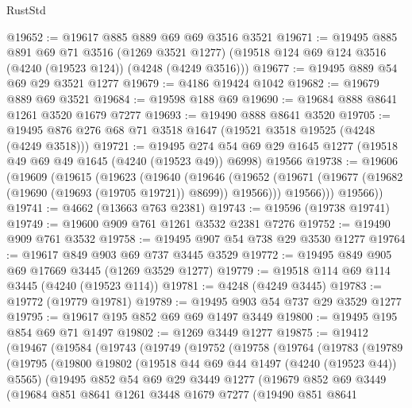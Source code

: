 \begin{lexlean}{RustStd}
\begin{coremodule}
{\begin{coremodule}
{{{{{{{{{{{{{{{{{{{{{{{{{{{{{{{{{{{@19652 := @19617 @885 @889 @69 @69 @3516 @3521
@19671 := @19495
    @885
    @891
    @69
    @71
    @3516
    (@1269 @3521 @1277)
    (@19518 @124 @69 @124 @3516 (@4240 (@19523 @124)) (@4248 (@4249 @3516)))
@19677 := @19495 @889 @54 @69 @29 @3521 @1277
@19679 := @4186 @19424 @1042
@19682 := @19679 @889 @69 @3521
@19684 := @19598 @188 @69
@19690 := @19684 @888 @8641 @1261 @3520 @1679 @7277
@19693 := @19490 @888 @8641 @3520
@19705 := @19495 @876 @276 @68 @71 @3518 @1647 (@19521 @3518 @19525 (@4248 (@4249 @3518)))
@19721 := @19495
    @274
    @54
    @69
    @29
    @1645
    @1277
    (@19518 @49 @69 @49 @1645 (@4240 (@19523 @49)) @6998)
    @19566
@19738 := @19606
    (@19609
      (@19615
        (@19623
          (@19640
            (@19646
              (@19652 (@19671 (@19677 (@19682 (@19690 (@19693 (@19705 @19721)) @8699)) @19566)))
              @19566)))
        @19566))
@19741 := @4662 (@13663 @763 @2381)
@19743 := @19596 (@19738 @19741)
@19749 := @19600 @909 @761 @1261 @3532 @2381 @7276
@19752 := @19490 @909 @761 @3532
@19758 := @19495 @907 @54 @738 @29 @3530 @1277
@19764 := @19617 @849 @903 @69 @737 @3445 @3529
@19772 := @19495 @849 @905 @69 @17669 @3445 (@1269 @3529 @1277)
@19779 := @19518 @114 @69 @114 @3445 (@4240 (@19523 @114))
@19781 := @4248 (@4249 @3445)
@19783 := @19772 (@19779 @19781)
@19789 := @19495 @903 @54 @737 @29 @3529 @1277
@19795 := @19617 @195 @852 @69 @69 @1497 @3449
@19800 := @19495 @195 @854 @69 @71 @1497
@19802 := @1269 @3449 @1277
@19875 := @19412
    (@19467
      (@19584
        (@19743
          (@19749
            (@19752
              (@19758
                (@19764
                  (@19783
                    (@19789
                      (@19795
                        (@19800
                          @19802
                          (@19518 @44 @69 @44 @1497 (@4240 (@19523 @44)) @5565)
                          (@19495
                            @852
                            @54
                            @69
                            @29
                            @3449
                            @1277
                            (@19679
                              @852
                              @69
                              @3449
                              (@19684
                                @851
                                @8641
                                @1261
                                @3448
                                @1679
                                @7277
                                (@19490
                                  @851
                                  @8641
}}}}}}}}}}}}}}}}}}}}}}}}}}}}}}}}}}}
\end{coremodule}}
\end{coremodule}
\end{lexlean}
